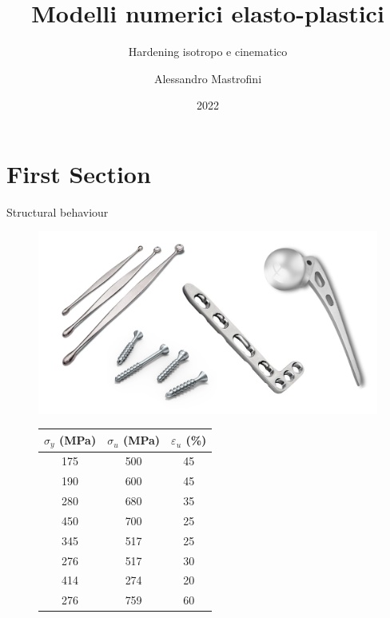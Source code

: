\documentclass[aspectratio=169,xcolor=dvipsnames]{beamer}
\title[short title]{Modelli numerici elasto-plastici} %
\subtitle{Hardening isotropo e cinematico}
\author[Pin-Yen] {Alessandro Mastrofini}
\institute[NTU] %
{
Meccanica Computazionale dei Tessuti e Biomateriali \\
Università degli Studi di Roma Tor Vergata%
}
\date{2022} %
\begin{document}
\begin{frame}
    \titlepage
\end{frame}

\section{First Section}
\begin{frame}{Structural behaviour}
	\begin{figure}
		\begin{minipage}[c]{0.3\linewidth}
			\tiny{
\def\svgwidth{\linewidth}
}
		\end{minipage}\hfill
	\begin{minipage}[c]{0.3\linewidth}
		\tiny{
\def\svgwidth{\linewidth}
}
	\end{minipage}\hfill
\begin{minipage}{0.3\linewidth}
	\centering
	\includegraphics[width=\linewidth]{stainless_steell_biomedical.png}
\vfill
\vspace{0.2\linewidth}
	\tiny{
\begin{tabular}{c|c|c}

	$\sigma_y$ (MPa)& $\sigma_u$ (MPa)& $\varepsilon_u$ (\%) \\
	\hline
	175 &  500& 45 \\
	\hline
	190 & 600 & 45 \\
	\hline
	280& 680 & 35 \\
	\hline
	450& 700 & 25 \\
	\hline
	345&  517& 25 \\
	\hline
	276& 517 &30  \\
	\hline
	414& 274 & 20 \\
	\hline
	276& 759 &60  \\

\end{tabular}}\vfill
\end{minipage}\hfill

		\end{figure}
\end{frame}
\end{document}
